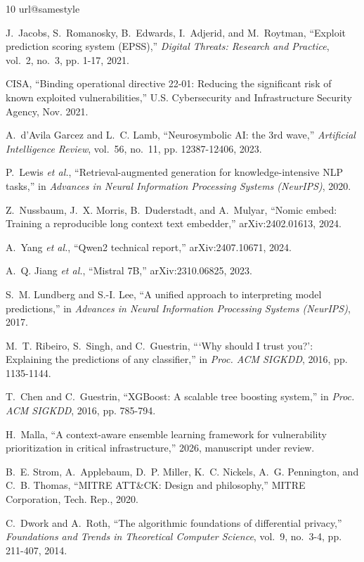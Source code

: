 \documentclass[journal]{IEEEtran}
\begin{document}
\begin{thebibliography}{10}
\providecommand{\url}[1]{#1}\csname url@samestyle\endcsname

J.~Jacobs, S.~Romanosky, B.~Edwards, I.~Adjerid, and M.~Roytman, ``Exploit
prediction scoring system (EPSS),'' \emph{Digital Threats: Research and
Practice}, vol.~2, no.~3, pp. 1-17, 2021.

{CISA}, ``Binding operational directive 22-01: Reducing the significant risk of
known exploited vulnerabilities,'' U.S. Cybersecurity and Infrastructure
Security Agency, Nov. 2021.

A.~d'Avila Garcez and L.~C. Lamb, ``Neurosymbolic AI: the 3rd wave,''
\emph{Artificial Intelligence Review}, vol.~56, no.~11, pp. 12387-12406, 2023.

P.~Lewis \emph{et al.}, ``Retrieval-augmented generation for knowledge-intensive
NLP tasks,'' in \emph{Advances in Neural Information Processing Systems
(NeurIPS)}, 2020.

Z.~Nussbaum, J.~X. Morris, B.~Duderstadt, and A.~Mulyar, ``Nomic embed: Training
a reproducible long context text embedder,'' arXiv:2402.01613, 2024.

A.~Yang \emph{et al.}, ``Qwen2 technical report,'' arXiv:2407.10671, 2024.

A.~Q. Jiang \emph{et al.}, ``Mistral 7B,'' arXiv:2310.06825, 2023.

S.~M. Lundberg and S.-I. Lee, ``A unified approach to interpreting model
predictions,'' in \emph{Advances in Neural Information Processing Systems
(NeurIPS)}, 2017.

M.~T. Ribeiro, S.~Singh, and C.~Guestrin, ```Why should I trust you?':
Explaining the predictions of any classifier,'' in \emph{Proc. ACM SIGKDD}, 2016,
pp. 1135-1144.

T.~Chen and C.~Guestrin, ``XGBoost: A scalable tree boosting system,'' in
\emph{Proc. ACM SIGKDD}, 2016, pp. 785-794.

H.~Malla, ``A context-aware ensemble learning framework for vulnerability
prioritization in critical infrastructure,'' 2026, manuscript under review.

B.~E. Strom, A.~Applebaum, D.~P. Miller, K.~C. Nickels, A.~G. Pennington, and
C.~B. Thomas, ``MITRE ATT\&CK: Design and philosophy,'' MITRE Corporation, Tech.
Rep., 2020.

C.~Dwork and A.~Roth, ``The algorithmic foundations of differential privacy,''
\emph{Foundations and Trends in Theoretical Computer Science}, vol.~9, no.~3-4,
pp. 211-407, 2014.

\end{thebibliography}
\end{document}

